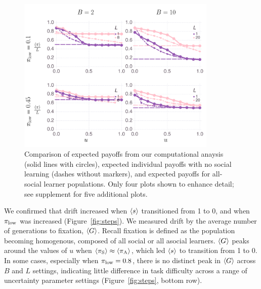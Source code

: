\documentclass[letterpaper,11.5pt]{scrartcl}
\begin{document}
\begin{figure}
  \caption{Comparison of expected payoffs from our computational anaysis (solid
    lines with circles), expected individual payoffs with no social learning
    (dashes without markers), and expected payoffs for all-social learner 
    populations. Only four plots shown to enhance detail; see supplement for
    five additional plots.
} 
  \label{fig:payoffs}
\centering
    \includegraphics[width=0.85\textwidth]{Figures/meanNetPayoffs.pdf}
\end{figure}

We confirmed that drift increased when $\langle s \rangle$ transitioned from 1 to 0, 
and when $\pi_{\mathrm{low}}$ was increased (Figure~\ref{fig:steps}). 
We measured drift by the average number of 
generations to fixation, $\langle G \rangle$. Recall fixation is defined as the population
becoming homogenous, composed of all social or all asocial learners. 
$\langle G \rangle$ peaks around the values of $u$ 
when $\langle \pi_\mathrm{S} \rangle \approx \langle \pi_\mathrm{A} \rangle$, which led $\langle s \rangle$ to transition from 1 to 0.
In some cases, especially when $\pi_{\mathrm{low}}=0.8$,
there is no distinct peak in $\langle G \rangle$ across $B$ and $L$ settings, 
indicating little difference in task difficulty across a range of uncertainty
parameter settings (Figure~\ref{fig:steps}, bottom row).
\end{document}
